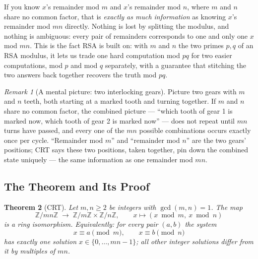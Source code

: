 \documentclass[11pt]{article}
\newtheorem{theorem}{Theorem}[section]
\theoremstyle{definition}
\theoremstyle{remark}
\newtheorem{remark}[theorem]{Remark}
\newcommand{\minorhead}[1]{\par\medskip\noindent{\large\bfseries\itshape #1}\par\nopagebreak\smallskip}
\begin{document}
\minorhead{Step 3: the general statement, in words}

If you know $x$'s remainder mod $m$ and $x$'s remainder mod $n$, where $m$ and $n$ share no common factor, that is \emph{exactly as much information} as knowing $x$'s remainder mod $mn$ directly. Nothing is lost by splitting the modulus, and nothing is ambiguous: every pair of remainders corresponds to one and only one $x$ mod $mn$. This is the fact RSA is built on: with $m$ and $n$ the two primes $p,q$ of an RSA modulus, it lets us trade one hard computation mod $pq$ for two easier computations, mod $p$ and mod $q$ separately, with a guarantee that stitching the two answers back together recovers the truth mod $pq$.


\begin{remark}[A mental picture: two interlocking gears]
Picture two gears with $m$ and $n$ teeth, both starting at a marked tooth and turning together. If $m$ and $n$ share no common factor, the combined picture — ``which tooth of gear 1 is marked now, which tooth of gear 2 is marked now'' — does not repeat until $mn$ turns have passed, and every one of the $mn$ possible combinations occurs exactly once per cycle. ``Remainder mod $m$'' and ``remainder mod $n$'' are the two gears' positions; CRT says these two positions, taken together, pin down the combined state uniquely — the same information as one remainder mod $mn$.
\end{remark}



\subsection{The Theorem and Its Proof}\label{sec:crt-thm}

\begin{theorem}[CRT]\label{thm:crt}
Let $m,n\ge2$ be integers with $\gcd(m,n)=1$. The map
\[
\mathbb{Z}/mn\mathbb{Z} \;\longrightarrow\; \mathbb{Z}/m\mathbb{Z} \times \mathbb{Z}/n\mathbb{Z}, \qquad x \mapsto (x \bmod m,\ x \bmod n)
\]
is a ring isomorphism. Equivalently: for every pair $(a,b)$ the system
\[
x \equiv a \pmod m, \qquad x \equiv b \pmod n
\]
has exactly one solution $x \in \{0, \dots, mn-1\}$; all other integer solutions differ from it by multiples of $mn$.
\end{theorem}
\end{document}
